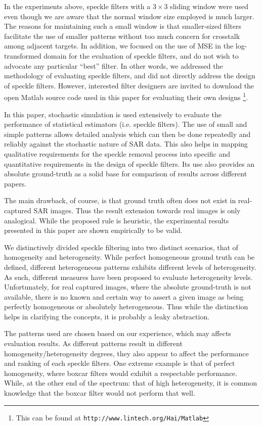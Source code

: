 In the experiments above, speckle filters with a $3 \times 3$ sliding window were used 
	even though we are aware that the normal window size employed is much larger. 
The reasons for maintaining such a small window is that 
	smaller-sized filters facilitate the use of smaller patterns without too much concern for crosstalk 
	among adjacent targets.
In addition, we focused on the use of MSE in the log-transformed domain for the evaluation of speckle filters, 
	and do not wish to advocate any particular ``best'' filter. 
In other words, we addressed the methodology of evaluating speckle filters, 
	and did not directly address the design of speckle filters.
However, interested filter designers are invited to download the open Matlab source code used in this paper 
for evaluating their own designs
  \footnote{This can be found at \texttt{http://www.lintech.org/Hai/Matlab}}.

In this paper, stochastic simulation is used extensively to evaluate the performance of statistical estimators 
(i.e. speckle filters).
The use of small and simple patterns allows detailed analysis
  which can then be done repeatedly and reliably against the 
stochastic nature of SAR data.
This also helps in mapping qualitative requirements for the speckle removal process into specific and quantitative 
requirements in the design of speckle filters.
Its use also provides an absolute ground-truth as a solid base for comparison of results across different papers.

The main drawback, of course, is that ground truth often does not exist in real-captured SAR images.
Thus the result extension towards real images is only analogical.
While the proposed rule is heuristic, 
	the experimental results presented in this paper are shown empirically to be valid.

We distinctively divided speckle filtering into two distinct scenarios, that of homogeneity and heterogeneity.
While perfect homogeneous ground truth can be defined, 
	different heterogeneous patterns exhibits different levels of heterogeneity. 
As such, different measures have been proposed to evaluate heterogeneity levels.
Unfortunately, for real captured images, where the absolute ground-truth is not available, 
	there is no known and certain way to assert a given image as being perfectly homogeneous or 
	absolutely heterogeneous.
Thus while the distinction helps in clarifying the concepts, 
	it is probably a leaky abstraction.

The patterns used are chosen based on our experience, which may affects evaluation results. 
As different patterns result in different homogeneity/heterogeneity degrees, 
	they also appear to affect the performance and ranking of each speckle filters.
One extreme example is that of perfect homogeneity, where boxcar filters would exhibit a respectable performance.
While, at the other end of the spectrum: that of high heterogeneity, it is common knowledge that the boxcar filter 
	would not perform that well.

